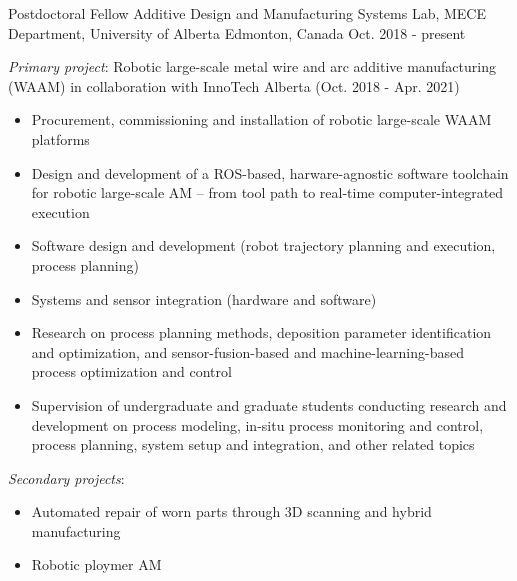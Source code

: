 \begin{cventries}
  \cventry
    {Postdoctoral Fellow} %
    {Additive Design and Manufacturing Systems Lab, MECE Department, University of Alberta} %
    {Edmonton, Canada} %
    {Oct. 2018 - present} %
    {
      \begin{cvitems}
        \item \emph{Primary project}: Robotic large-scale metal wire and arc additive manufacturing (WAAM) \newline
        in collaboration with InnoTech Alberta (Oct. 2018 - Apr. 2021)
        \begin{itemize}
          \item Procurement, commissioning and installation of robotic large-scale WAAM platforms
          \item Design and development of a ROS-based, harware-agnostic software toolchain for robotic large-scale AM -- from tool path to real-time computer-integrated execution
          \item Software design and development (robot trajectory planning and execution, process planning)
          \item Systems and sensor integration (hardware and software)
          \item Research on process planning methods, deposition parameter identification and optimization, and sensor-fusion-based and machine-learning-based process optimization and control
          \item Supervision of undergraduate and graduate students conducting research and development on process modeling, 
                in-situ process monitoring and control, process planning, system setup and integration, and other related topics
        \end{itemize}
        \item \emph{Secondary projects}:
        \begin{itemize}
          \item Automated repair of worn parts through 3D scanning and hybrid manufacturing
          \item Robotic ploymer AM
        \end{itemize}
      \end{cvitems}
    }


\end{cventries}
